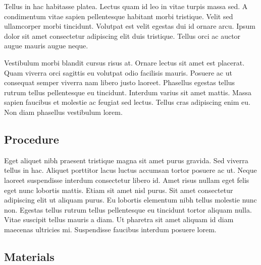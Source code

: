 \documentclass[letterpaper,\myfontsize]{article}
\begin{document}
Tellus in hac habitasse platea. Lectus quam id leo in vitae turpis massa sed. A condimentum vitae sapien pellentesque habitant morbi tristique. Velit sed ullamcorper morbi tincidunt. Volutpat est velit egestas dui id ornare arcu. Ipsum dolor sit amet consectetur adipiscing elit duis tristique. Tellus orci ac auctor augue mauris augue neque. 

Vestibulum morbi blandit cursus risus at. Ornare lectus sit amet est placerat. Quam viverra orci sagittis eu volutpat odio facilisis mauris. Posuere ac ut consequat semper viverra nam libero justo laoreet. Phasellus egestas tellus rutrum tellus pellentesque eu tincidunt. Interdum varius sit amet mattis. Massa sapien faucibus et molestie ac feugiat sed lectus. Tellus cras adipiscing enim eu. Non diam phasellus vestibulum lorem.


\subsection{Procedure}

Eget aliquet nibh praesent tristique magna sit amet purus gravida. Sed viverra tellus in hac. Aliquet porttitor lacus luctus accumsan tortor posuere ac ut. Neque laoreet suspendisse interdum consectetur libero id. Amet risus nullam eget felis eget nunc lobortis mattis. Etiam sit amet nisl purus. Sit amet consectetur adipiscing elit ut aliquam purus. Eu lobortis elementum nibh tellus molestie nunc non. Egestas tellus rutrum tellus pellentesque eu tincidunt tortor aliquam nulla. Vitae suscipit tellus mauris a diam. Ut pharetra sit amet aliquam id diam maecenas ultricies mi. Suspendisse faucibus interdum posuere lorem.


\subsection{Materials}
\end{document}
